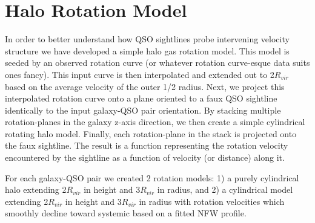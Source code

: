 \documentclass[iop]{emulateapj-rtx4}
\begin{document}
%
%
%
%
%



\section{Halo Rotation Model}
In order to better understand how QSO sightlines probe intervening velocity structure we have developed a simple halo gas rotation model. This model is seeded by an observed rotation curve (or whatever rotation curve-esque data suits ones fancy). This input curve is then interpolated and extended out to 2$R_{vir}$ based on the average velocity of the outer 1/2 radius. Next, we project this interpolated rotation curve onto a plane oriented to a faux QSO sightline identically to the input galaxy-QSO pair orientation. By stacking multiple rotation-planes in the galaxy z-axis direction, we then create a simple cylindrical rotating halo model. Finally, each rotation-plane in the stack is projected onto the faux sightline. The result is a function representing the rotation velocity encountered by the sightline as a function of velocity (or distance) along it.

For each galaxy-QSO pair we created 2 rotation models: 1) a purely cylindrical halo extending 2$R_{vir}$ in height and 3$R_{vir}$ in radius, and 2) a cylindrical model extending 2$R_{vir}$ in height and 3$R_{vir}$ in radius with rotation velocities which smoothly decline toward systemic based on a fitted NFW profile.



\end{document}
